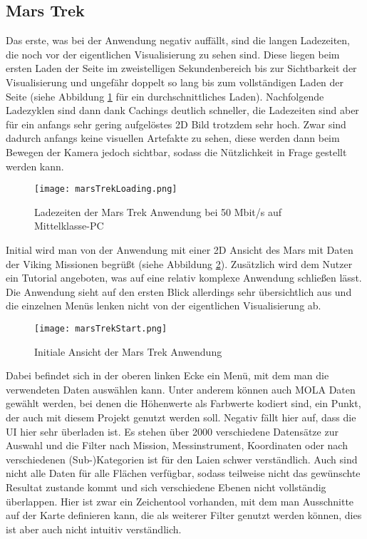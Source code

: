 \subsection{Mars Trek}\label{marsTrek}
Das erste, was bei der Anwendung negativ auffällt, sind die langen Ladezeiten, die noch vor der eigentlichen Visualisierung zu sehen sind. Diese liegen beim ersten Laden der Seite im zweistelligen Sekundenbereich bis zur Sichtbarkeit der Visualisierung und ungefähr doppelt so lang bis zum vollständigen Laden der Seite (siehe Abbildung \ref{marsTrekLoading} für ein durchschnittliches Laden). Nachfolgende Ladezyklen sind dann dank Cachings deutlich schneller, die Ladezeiten sind aber für ein anfangs sehr gering aufgelöstes 2D Bild trotzdem sehr hoch. Zwar sind dadurch anfangs keine visuellen Artefakte zu sehen, diese werden dann beim Bewegen der Kamera jedoch sichtbar, sodass die Nützlichkeit in Frage gestellt werden kann.

\begin{figure}[H]
  \texttt{[image: marsTrekLoading.png]}
  \caption{Ladezeiten der Mars Trek Anwendung bei 50 Mbit/s auf Mittelklasse-PC}
  \label{marsTrekLoading}
\end{figure}

Initial wird man von der Anwendung mit einer 2D Ansicht des Mars mit Daten der Viking Missionen begrüßt (siehe Abbildung \ref{marsTrekStart}). Zusätzlich wird dem Nutzer ein Tutorial angeboten, was auf eine relativ komplexe Anwendung schließen lässt. Die Anwendung sieht auf den ersten Blick allerdings sehr übersichtlich aus und die einzelnen Menüs lenken nicht von der eigentlichen Visualisierung ab.

\begin{figure}[H]
  \texttt{[image: marsTrekStart.png]}
  \caption{Initiale Ansicht der Mars Trek Anwendung}
  \label{marsTrekStart}
\end{figure}

Dabei befindet sich in der oberen linken Ecke ein Menü, mit dem man die verwendeten Daten auswählen kann. Unter anderem können auch MOLA Daten gewählt werden, bei denen die Höhenwerte als Farbwerte kodiert sind, ein Punkt, der auch mit diesem Projekt genutzt werden soll. Negativ fällt hier auf, dass die UI hier sehr überladen ist. Es stehen über 2000 verschiedene Datensätze zur Auswahl und die Filter nach Mission, Messinstrument, Koordinaten oder nach verschiedenen (Sub-)Kategorien ist für den Laien schwer verständlich. Auch sind nicht alle Daten für alle Flächen verfügbar, sodass teilweise nicht das gewünschte Resultat zustande kommt und sich verschiedene Ebenen nicht vollständig überlappen. Hier ist zwar ein Zeichentool vorhanden, mit dem man Ausschnitte auf der Karte definieren kann, die als weiterer Filter genutzt werden können, dies ist aber auch nicht intuitiv verständlich. 


